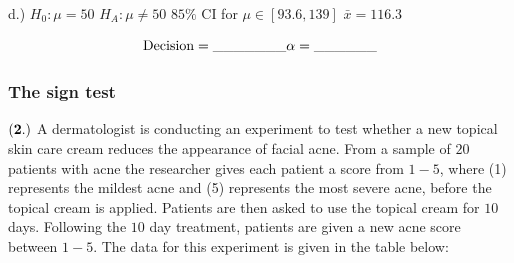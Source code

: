 \documentclass[
]{article}
\begin{document}
d.) \(H_0: \mu = 50\) \(H_A: \mu \neq 50\) \(85\%\) CI for
\(\mu \in [93.6, 139]\) \(\bar{x} = 116.3\)

\[ \text{Decision} = \_\_\_\_\_\_\_ \\
  \alpha = \_\_\_\_\_\_ \]

\subsubsection{The sign test}\label{the-sign-test}

\(\bf (2.)\) A dermatologist is conducting an experiment to test whether
a new topical skin care cream reduces the appearance of facial acne.
From a sample of \(20\) patients with acne the researcher gives each
patient a score from \(1-5\), where (1) represents the mildest acne and
(5) represents the most severe acne, before the topical cream is
applied. Patients are then asked to use the topical cream for \(10\)
days. Following the \(10\) day treatment, patients are given a new acne
score between \(1-5\). The data for this experiment is given in the
table below:
\end{document}
